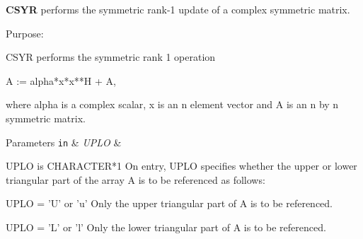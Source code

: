 {\bfseries C\+S\+Y\+R} performs the symmetric rank-\/1 update of a complex symmetric matrix. 

 \begin{DoxyParagraph}{Purpose\+: }
\begin{DoxyVerb} CSYR   performs the symmetric rank 1 operation

    A := alpha*x*x**H + A,

 where alpha is a complex scalar, x is an n element vector and A is an
 n by n symmetric matrix.\end{DoxyVerb}
 
\end{DoxyParagraph}

\begin{DoxyParams}[1]{Parameters}
\mbox{\tt in}  & {\em U\+P\+L\+O} & \begin{DoxyVerb}          UPLO is CHARACTER*1
           On entry, UPLO specifies whether the upper or lower
           triangular part of the array A is to be referenced as
           follows:

              UPLO = 'U' or 'u'   Only the upper triangular part of A
                                  is to be referenced.

              UPLO = 'L' or 'l'   Only the lower triangular part of A
                                  is to be referenced.


\end{DoxyVerb}
\end{DoxyParams}
